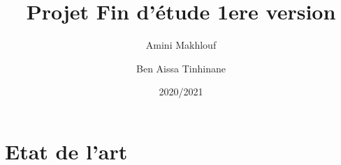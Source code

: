 \documentclass[11pt]{report}
\title{Projet Fin d'étude 1ere version}
\author{Amini Makhlouf \and Ben Aissa Tinhinane}
\date{2020/2021}
\begin{document}
   \maketitle
   \tableofcontents
   \part{Etat de l'art}
   
   \newpage
   
\end{document}
